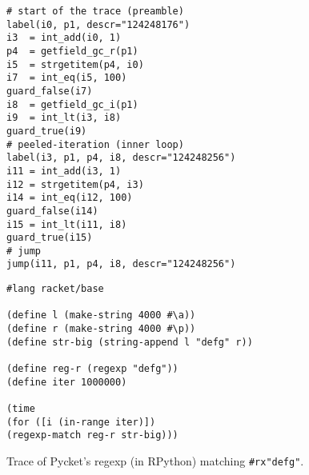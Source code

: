 \begin{figure}[tbp]
		\centering
\begin{minipage}{0.9\textwidth}
\begin{lstlisting}[language=rptrace]
# start of the trace (preamble)
label(i0, p1, descr="124248176")
i3  = int_add(i0, 1)
p4  = getfield_gc_r(p1)
i5  = strgetitem(p4, i0)
i7  = int_eq(i5, 100)
guard_false(i7)
i8  = getfield_gc_i(p1)
i9  = int_lt(i3, i8)
guard_true(i9)
# peeled-iteration (inner loop)
label(i3, p1, p4, i8, descr="124248256")
i11 = int_add(i3, 1)
i12 = strgetitem(p4, i3)
i14 = int_eq(i12, 100)
guard_false(i14)
i15 = int_lt(i11, i8)
guard_true(i15)
# jump
jump(i11, p1, p4, i8, descr="124248256")
\end{lstlisting}
\end{minipage}

	\vspace{0.8em} %

	\begin{minipage}{0.9\textwidth}
\begin{lstlisting}[language=racket]
#lang racket/base

(define l (make-string 4000 #\a))
(define r (make-string 4000 #\p))
(define str-big (string-append l "defg" r))

(define reg-r (regexp "defg"))
(define iter 1000000)

(time
(for ([i (in-range iter)])
(regexp-match reg-r str-big)))
\end{lstlisting}
	\end{minipage}

	\caption{\small Trace of Pycket's regexp (in RPython) matching
			{\tt\#rx"defg"}.}
	\label{fig:regexp-example-defg}
\end{figure}